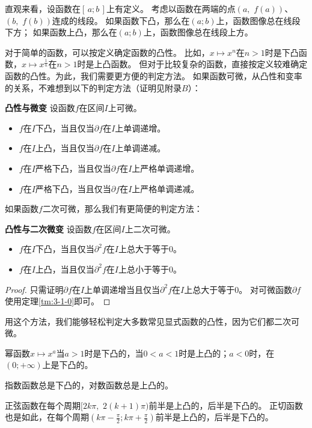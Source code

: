 \documentclass[12pt,UTF8]{ctexbook}
\begin{document}
直观来看，设函数在$[\,a; b\,]$上有定义。
考虑以函数在两端的点$(a,\,\, f(a))$、$(b,\,\, f(b))$连成的线段。
如果函数下凸，那么在$(a;b)$上，函数图像总在线段下方；
如果函数上凸，那么在$(a;b)$上，函数图像总在线段上方。

对于简单的函数，可以按定义确定函数的凸性。
比如，$x\mapsto x^n$在$n>1$时是下凸函数，$x\mapsto x^\frac{1}{n}$在$n>1$时是上凸函数。
但对于比较复杂的函数，直接按定义较难确定函数的凸性。为此，我们需要更方便的判定方法。
如果函数可微，从凸性和变率的关系，不难想到以下的判定方法（证明见附录$B$）：

\begin{tm}{\textbf{凸性与微变}}
    设函数$f$在区间$I$上可微。
    \begin{itemize}
        \item $f$在$I$下凸，当且仅当$\partial f$在$I$上单调递增。
        \item $f$在$I$上凸，当且仅当$\partial f$在$I$上单调递减。
        \item $f$在$I$严格下凸，当且仅当$\partial f$在$I$上严格单调递增。
        \item $f$在$I$严格下凸，当且仅当$\partial f$在$I$上严格单调递减。
    \end{itemize}
\end{tm}

如果函数$f$二次可微，那么我们有更简便的判定方法：
\begin{tm}\textbf{凸性与二次微变}
    设函数$f$在区间$I$上二次可微。
    \begin{itemize}
        \item $f$在$I$下凸，当且仅当$\partial^2 f$在$I$上总大于等于$0$。
        \item $f$在$I$上凸，当且仅当$\partial^2 f$在$I$上总小于等于$0$。
    \end{itemize}
\end{tm}

\begin{proof}
    只需证明$\partial f$在$I$上单调递增当且仅当$\partial^2 f$在$I$上总大于等于$0$。
    对可微函数$\partial f$使用定理\ref{tm:3-1-0}即可。
\end{proof}

用这个方法，我们能够轻松判定大多数常见显式函数的凸性，因为它们都二次可微。

幂函数$x\mapsto x^a$当$a>1$时是下凸的，当$0<a<1$时是上凸的；$a<0$时，在$(0;+\infty)$上是下凸的。

指数函数总是下凸的，对数函数总是上凸的。

正弦函数在每个周期$[2k\pi, \,\, 2(k+1)\pi)$前半是上凸的，后半是下凸的。
正切函数也是如此，在每个周期$(k\pi-\frac{\pi}{2}; k\pi+\frac{\pi}{2})$前半是上凸的，后半是下凸的。
\end{document}
